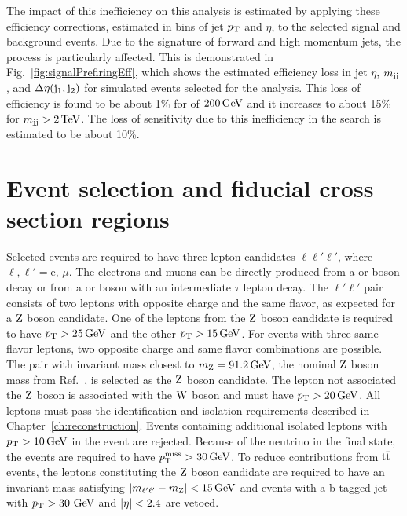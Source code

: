 The impact of this inefficiency on this analysis is estimated by applying
these efficiency corrections, estimated in bins of jet $p_{\mathrm{T}}$ and $\eta$,
to the selected signal and background events. Due to the signature of forward
and high momentum jets, the \EWWZ process is particularly affected. 
This is demonstrated in Fig.~\ref{fig:signalPrefiringEff}, which shows the
estimated efficiency loss in jet $\eta$, $m_{\mathrm{jj}}$, and $\Delta\eta(\mathrm{j}_{1}, \mathrm{j}_{2})$
for simulated \EWWZ events selected for the analysis.
This loss of efficiency is found to be about 
1\% for {\mjj} of $200\,\text{Ge\hspace{-.08em}V}$ and it increases to about 15\% for $m_{\mathrm{jj}} > 2\,\text{Te\hspace{-.08em}V}$.
The loss of sensitivity due to this inefficiency in the \EWWZ search is estimated 
to be about 10\%. 

\section{Event selection and fiducial cross section regions}
\label{sec:eventselection}

Selected events are required to have three lepton candidates $\ell\ell'\ell'$,
where $\ell, \ell' = \mathrm{e}$, $\mu$.
The electrons and muons can be directly produced from a \W or \Z boson decay or from a \PW or \Z
boson with an intermediate $\tau$ lepton decay.
The $\ell'\ell'$ pair consists of two leptons with opposite charge and the same flavor,
as expected for a $\mathrm{Z}$ boson candidate.
One of the leptons from the $\mathrm{Z}$ boson candidate is required to have $p_{\mathrm{T}} > 25\,\text{Ge\hspace{-.08em}V}$ and the other
$p_{\mathrm{T}} > 15\,\text{Ge\hspace{-.08em}V}$.
For events with three same-flavor leptons, two opposite charge and same flavor combinations are possible.
The pair with invariant mass closest to $m_{\mathrm{Z}} = 91.2\,\text{Ge\hspace{-.08em}V}$, the nominal $\mathrm{Z}$ boson mass from
Ref.~\cite{Tanabashi:2018oca}, is selected as the $\mathrm{Z}$ boson candidate.
The lepton not associated the $\mathrm{Z}$ boson is associated with the $\mathrm{W}$ boson and must have $p_{\mathrm{T}} > 20\,\text{Ge\hspace{-.08em}V}$. All leptons
must pass the identification and isolation requirements
described in Chapter~\ref{ch:reconstruction}.
Events containing additional isolated leptons with $p_{\mathrm{T}} > 10\,\text{Ge\hspace{-.08em}V}$ in the event are rejected.
Because of the neutrino in the final state, the events are required to have $p_{\mathrm{T}}^\text{miss} > 30\,\text{Ge\hspace{-.08em}V}$. 
To reduce contributions from ${\mathrm{t}\overline{\mathrm{t}}}$ events,
the leptons constituting the $\mathrm{Z}$ boson candidate are required to have an invariant mass satisfying
$\left|m_{\ell'\ell'} - m_{\mathrm{Z}}\right| < 15\,\text{Ge\hspace{-.08em}V} $ and events with a 
b tagged jet with $p_{\mathrm{T}} > 30\,\,\text{Ge\hspace{-.08em}V}$ and $\lvert \eta \rvert < 2.4$ are vetoed.

